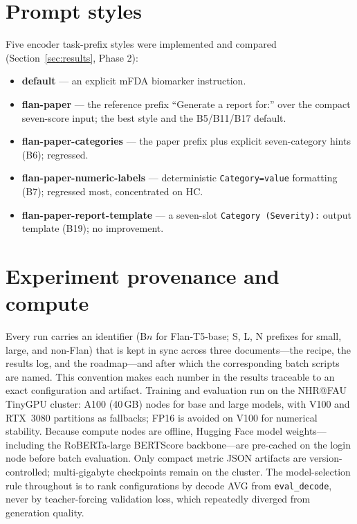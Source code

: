 \documentclass[11pt,twocolumn]{article}
\newcommand{\bt}[1]{\texttt{#1}}
\begin{document}
\section{Prompt styles}
\label{app:prompts}
Five encoder task-prefix styles were implemented and compared (Section~\ref{sec:results},
Phase 2):
\begin{itemize}[leftmargin=1.2em,itemsep=0.12em,topsep=0.2em]
  \item \textbf{default} --- an explicit mFDA biomarker instruction.
  \item \textbf{flan-paper} --- the reference prefix ``Generate a report for:'' over the compact
        seven-score input; the best style and the B5/B11/B17 default.
  \item \textbf{flan-paper-categories} --- the paper prefix plus explicit seven-category hints
        (B6); regressed.
  \item \textbf{flan-paper-numeric-labels} --- deterministic \bt{Category=value} formatting (B7);
        regressed most, concentrated on HC.
  \item \textbf{flan-paper-report-template} --- a seven-slot \bt{Category (Severity):} output
        template (B19); no improvement.
\end{itemize}

\section{Experiment provenance and compute}
\label{app:compute}
Every run carries an identifier (B$n$ for Flan-T5-base; S, L, N prefixes for small, large, and
non-Flan) that is kept in sync across three documents---the recipe, the results log, and the
roadmap---and after which the corresponding batch scripts are named. This convention makes each
number in the results traceable to an exact configuration and artifact. Training and evaluation
run on the NHR@FAU TinyGPU cluster: A100 (40\,GB) nodes for base and large models, with V100 and
RTX~3080 partitions as fallbacks; FP16 is avoided on V100 for numerical stability. Because compute
nodes are offline, Hugging Face model weights---including the RoBERTa-large BERTScore
backbone---are pre-cached on the login node before batch evaluation. Only compact metric JSON
artifacts are version-controlled; multi-gigabyte checkpoints remain on the cluster. The
model-selection rule throughout is to rank configurations by decode AVG from \bt{eval\_decode},
never by teacher-forcing validation loss, which repeatedly diverged from generation quality.
\end{document}
